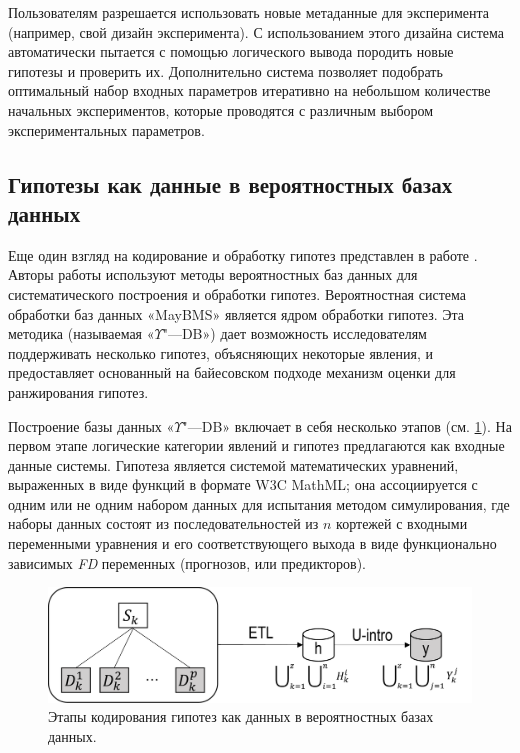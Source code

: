 Пользователям разрешается использовать новые метаданные для эксперимента (например, свой дизайн эксперимента). 
С использованием этого дизайна система автоматически пытается с помощью логического вывода породить новые 
гипотезы и проверить их. Дополнительно система позволяет подобрать оптимальный набор входных параметров 
итеративно на небольшом количестве начальных экспериментов, которые проводятся с различным выбором 
экспериментальных параметров.

\subsection{Гипотезы как данные в вероятностных базах данных}\label{sect1_3_3}
Еще один взгляд на кодирование и обработку гипотез представлен в работе \cite{GoncalvesP14}. Авторы работы используют 
методы вероятностных баз данных для систематического построения и обработки гипотез. Вероятностная система обработки 
баз данных «MayBMS» \cite{huang2009maybms} является ядром обработки гипотез. Эта методика (называемая 
«$\Upsilon$"---DB») дает возможность исследователям поддерживать несколько гипотез, объясняющих некоторые явления, 
и предоставляет основанный на байесовском подходе механизм оценки для ранжирования гипотез.

Построение базы данных «$\Upsilon$"---DB» включает в себя несколько этапов (см. \cref{fig:Upsilon_db_pipeline}). 
На первом этапе логические категории явлений и гипотез предлагаются как входные данные системы. Гипотеза является 
системой математических уравнений, выраженных в виде функций в формате W3C MathML; она ассоциируется с одним или не 
одним набором данных для испытания методом симулирования, где наборы данных состоят из последовательностей из $n$ 
кортежей с входными переменными уравнения и его соответствующего выхода в виде функционально зависимых \textit{FD} 
переменных (прогнозов, или предикторов). 

\begin{figure}[ht]
    \centering
    \includegraphics[width=0.7\linewidth]{images/Upsilon_db_pipeline.pdf}
    \caption{Этапы кодирования гипотез как данных в вероятностных базах данных.}\label{fig:Upsilon_db_pipeline}
\end{figure}

